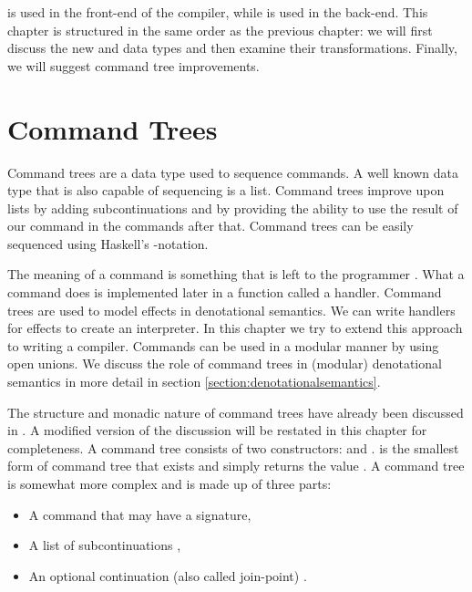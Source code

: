  is used in the front-end of the compiler, while  is used in the back-end. This chapter is structured in the same order as the previous chapter: we will first discuss the new  and  data types and then examine their transformations. Finally, we will suggest command tree improvements.

\section{\label{section:commandtree}Command Trees}
Command trees are a data type used to sequence commands. A well known data type that is also capable of sequencing is a list. Command trees improve upon lists by adding subcontinuations and by providing the ability to use the result of our command in the commands after that. Command trees can be easily sequenced using Haskell's -notation.

The meaning of a command is something that is left to the programmer \autocite{DBLP:journals/corr/PlotkinP13, DBLP:conf/haskell/WuSH14}. What a command does is implemented later in a function called a handler. Command trees are used to model effects in denotational semantics. We can write handlers for effects to create an interpreter. In this chapter we try to extend this approach to writing a compiler. Commands can be used in a modular manner by using open unions. We discuss the role of command trees in (modular) denotational semantics in more detail in section \ref{section:denotationalsemantics}.


The structure and monadic nature of command trees have already been discussed in  \autocite{commandtreespoulsen}. A modified version of the discussion will be restated in this chapter for completeness. A command tree consists of two constructors:  and .  is the smallest form of command tree that exists and simply returns the value . A  command tree is somewhat more complex and is made up of three parts:

\begin{itemize}
\item A command  that may have a signature,
\item A list of subcontinuations ,
\item An optional continuation (also called join-point) .
\end{itemize}


